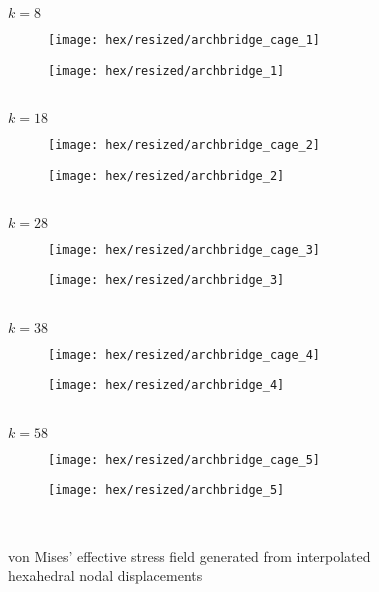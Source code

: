 \begin{figure}[!htbp]
    \begin{center}
        $k=8$
        \quad
        \begin{subfigure}[b]{0.4\textwidth}
            \centering
            \texttt{[image: hex/resized/archbridge\_cage\_1]}
        \end{subfigure}
        \begin{subfigure}[b]{0.35\textwidth}
            \centering
            \texttt{[image: hex/resized/archbridge\_1]}
        \end{subfigure}\\ 

        $k=18$
        \quad
        \begin{subfigure}[b]{0.4\textwidth}
            \centering
            \texttt{[image: hex/resized/archbridge\_cage\_2]}
        \end{subfigure}
        \begin{subfigure}[b]{0.35\textwidth}
            \centering
            \texttt{[image: hex/resized/archbridge\_2]}
        \end{subfigure}\\ 


        $k=28$
        \quad
        \begin{subfigure}[b]{0.4\textwidth}
            \centering
            \texttt{[image: hex/resized/archbridge\_cage\_3]}
        \end{subfigure}
        \begin{subfigure}[b]{0.35\textwidth}
            \centering
            \texttt{[image: hex/resized/archbridge\_3]}
        \end{subfigure}\\ 


        $k=38$
        \quad
        \begin{subfigure}[b]{0.4\textwidth}
            \centering
            \texttt{[image: hex/resized/archbridge\_cage\_4]}
        \end{subfigure}
        \begin{subfigure}[b]{0.35\textwidth}
            \centering
            \texttt{[image: hex/resized/archbridge\_4]}
        \end{subfigure}\\ 


        $k=58$
        \quad
        \begin{subfigure}[b]{0.4\textwidth}
            \centering
            \texttt{[image: hex/resized/archbridge\_cage\_5]}
        \end{subfigure}
        \begin{subfigure}[b]{0.35\textwidth}
            \centering
            \texttt{[image: hex/resized/archbridge\_5]}
        \end{subfigure}\\ 


        \caption{\label{fig:5} von Mises' effective stress field generated from interpolated hexahedral nodal displacements}
    \end{center}
\end{figure}